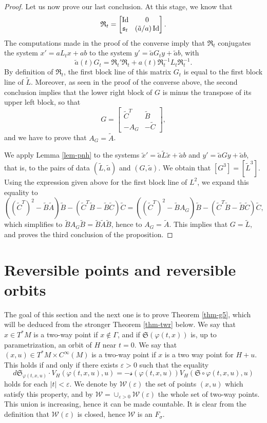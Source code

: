 \documentclass[JEP,XML,SOM,Unicode,published]{cedram}
\DeclareMathOperator{\Id}{Id}
\let\epsilon\varepsilon
\newcommand{\gs}{\ensuremath{\mathfrak{s}}}
\newcommand{\gR}{\ensuremath{\mathfrak{R}}}
\newcommand{\gS}{\ensuremath{\mathfrak{S}}}
\newcommand{\ms}{\ensuremath{\mathscr{s}}}
\newcommand{\mW}{\ensuremath{\mathcal{W}}}
\theoremstyle{plain}
\theoremstyle{definition}
\begin{document}
\begin{proof}
Let us now prove our last conclusion. At this stage, we know that\vspace*{-3pt}
\[\arraycolsep4.5pt
\gR_t = \begin{bmatrix}
\Id&0\\ \gs_t & (\tilde a /a) \Id
\end{bmatrix}.
\]
The computations made in the proof of the converse imply that
$\gR_t$ conjugates the system $x'=aL_tx+ab$ to the system $y'=\tilde a G_t y +\tilde a b$,
with\vspace*{-3pt}
\[
\tilde a (t) G_t=\gR_t'\gR_t +a(t)\gR_t^{-1} L_t\gR_t^{-1}.
\]
By definition of $\gR_t$, the first block line of this matrix $G_t$ is equal to the first block line of $\tilde L$.
Moreover, as seen in the proof of the converse above, the second conclusion implies that the lower right block of $G$
is minus the transpose of its upper left block, so that\vspace*{-3pt}
\[
G=\begin{bmatrix}
\tilde C^T & \tilde B\\ -A_G & -\tilde C
\end{bmatrix},
\]
and we have to prove that $A_G=\tilde A$.

We apply Lemma \ref{lem-pnh} to the systems $\tilde x'=\tilde a \tilde L \tilde x+ \tilde a b$ and
$y'=\tilde a G y +\tilde a b$, that is, to the pairs of data $(\tilde L, \tilde a)$ and $(G,\tilde a)$.
We obtain that $[G^3]=[\tilde L^3]$.
Using the expression given above for the first block line of $L^2$, we
expand this equality to
\[
((\tilde C^T)^2-\tilde B \tilde A)\tilde B-(\tilde C^T\tilde B-\tilde B\tilde C)\tilde C=
((\tilde C^T)^2-\tilde B A_G)\tilde B-(\tilde C^T\tilde B-\tilde B\tilde C)\tilde C,
\]
which simplifies to $\tilde BA_G\tilde B= \tilde B \tilde A \tilde B$, hence to $A_G=\tilde A$.
This implies that $G=\tilde L$, and proves the third conclusion of the proposition.
\end{proof}

\section{Reversible points and reversible orbits}\label{sec-rev}

The goal of this section and the next one is to prove Theorem \ref{thm-g5},
which will be deduced from the stronger Theorem \ref{thm-twr} below.
We say that $x\in T^*M$ is a two-way point if $x\not \in \Gamma$, and if $\gS(\varphi(t,x))$ is, up to parametrization,
an orbit of $H$ near $t=0$. We say that $(x,u)\in T^*M \times C^{\infty}(M)$ is a two-way point if $x$ is a two way point for $H+u$.
This holds if and only if there exists $\epsilon>0$ such that the equality
\[
d\gS_{\varphi(t,x,u)}\cdot V_H(\varphi(t,x,u),u)=-\ms(\varphi(t,x,u))V_H(\gS\circ \varphi(t,x,u),u)
\]
holds for each $|t|<\epsilon$. We denote by $\mW(\epsilon)$ the set of points $(x,u)$ which satisfy this property, and by
$\mW=\cup_{\epsilon>0} \mW(\epsilon)$ the whole set of two-way points. This union is increasing, hence it can be made countable.
It is clear from the definition that $\mW(\epsilon)$ is closed, hence $\mW$ is an $F_{\sigma}$.
\end{document}
